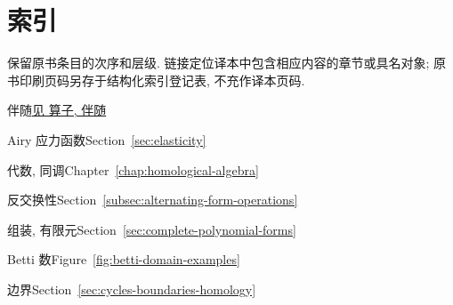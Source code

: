 \clearpage\section*{{索引}}\label{back:index}
{保留原书条目的次序和层级. 链接定位译本中包含相应内容的章节或具名对象; 原书印刷页码另存于结构化索引登记表, 不充作译本页码.}
\begingroup\small\setlength{\parindent}{0pt}

\par\noindent\hspace*{0em}\label{index:adjoint}{伴随}\quad \hyperref[index:operator-adjoint]{{见 算子, 伴随}}

\par\noindent\hspace*{0em}\label{index:airy-stress-function}{Airy 应力函数}\quad Section~\ref{sec:elasticity}

\par\noindent\hspace*{0em}\label{index:algebra-homological}{代数, 同调}\quad Chapter~\ref{chap:homological-algebra}

\par\noindent\hspace*{0em}\label{index:anticommutativity}{反交换性}\quad Section~\ref{subsec:alternating-form-operations}

\par\noindent\hspace*{0em}\label{index:assembly-finite-element}{组装, 有限元}\quad Section~\ref{sec:complete-polynomial-forms}

\par\noindent\hspace*{0em}\label{index:betti-number}{Betti 数}\quad Figure~\ref{fig:betti-domain-examples}

\par\noindent\hspace*{0em}\label{index:boundary}{边界}\quad Section~\ref{sec:cycles-boundaries-homology}

